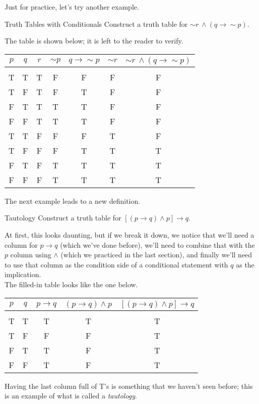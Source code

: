 Just for practice, let's try another example.

\begin{example}[https://www.youtube.com/watch?v=UDSeXDm9rfo]{Truth Tables with Conditionals}
Construct a truth table for $\sim r\ \wedge (q \to \sim p)$.

\sol
The table is shown below; it is left to the reader to verify.
\begin{center}
\begin{tabular}{|c c c c c c c|}
\hline
$p$ & $q$ & $r$ & $\sim p$ & $q \to \sim p$ & $\sim r$ & $\sim r\ \wedge (q \to \sim p)$\\
\hline
& & & & & &\\
T & T & T & F & F & F & F\\
T & F & T & F & T & F & F\\
F & T & T & T & T & F & F\\
F & F & T & T & T & F & F\\
T & T & F & F & F & T & F\\
T & F & F & F & T & T & T\\
F & T & F & T & T & T & T\\
F & F & F & T & T & T & T\\
\hline
\end{tabular}
\end{center}
\end{example}
\vfill
\pagebreak

The next example leads to a new definition.
\begin{example}[https://www.youtube.com/watch?v=adZZ2W6apWA]{Tautology}
Construct a truth table for $[(p \to q) \wedge p] \to q$.

\sol
At first, this looks daunting, but if we break it down, we notice that we'll need a column for $p \to q$ (which we've done before), we'll need to combine that with the $p$ column using $\wedge$ (which we practiced in the last section), and finally we'll need to use that column as the condition side of a conditional statement with $q$ as the implication.\\

The filled-in table looks like the one below.
\begin{center}
\begin{tabular}{|c c c c c|}
\hline
$p$ & $q$ & $p \to q$ & $(p \to q) \wedge p$ & $[(p \to q) \wedge p] \to q$\\
\hline
& & & &\\
T & T & T & T & T\\
T & F & F & F & T\\
F & T & T & F & T\\
F & F & T & F & T\\
\hline
\end{tabular}
\end{center}

Having the last column full of T's is something that we haven't seen before; this is an example of what is called a \textit{tautology}.
\end{example}

